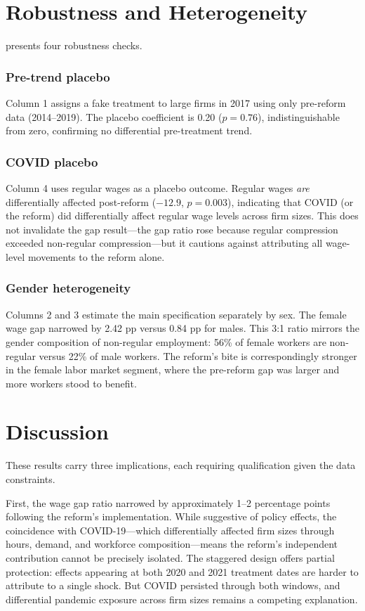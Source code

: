 \documentclass[12pt]{article}
\begin{document}
\section{Robustness and Heterogeneity}

 presents four robustness checks.

\subsubsection*{Pre-trend placebo} Column 1 assigns a fake treatment to large firms in 2017 using only pre-reform data (2014--2019). The placebo coefficient is 0.20 ($p = 0.76$), indistinguishable from zero, confirming no differential pre-treatment trend.

\subsubsection*{COVID placebo} Column 4 uses regular wages as a placebo outcome. Regular wages \textit{are} differentially affected post-reform ($-12.9$, $p = 0.003$), indicating that COVID (or the reform) did differentially affect regular wage levels across firm sizes. This does not invalidate the gap result---the gap ratio rose because regular compression exceeded non-regular compression---but it cautions against attributing all wage-level movements to the reform alone.

\subsubsection*{Gender heterogeneity} Columns 2 and 3 estimate the main specification separately by sex. The female wage gap narrowed by 2.42 pp versus 0.84 pp for males. This 3:1 ratio mirrors the gender composition of non-regular employment: 56\% of female workers are non-regular versus 22\% of male workers. The reform's bite is correspondingly stronger in the female labor market segment, where the pre-reform gap was larger and more workers stood to benefit.



\section{Discussion}

These results carry three implications, each requiring qualification given the data constraints.

First, the wage gap ratio narrowed by approximately 1--2 percentage points following the reform's implementation. While suggestive of policy effects, the coincidence with COVID-19---which differentially affected firm sizes through hours, demand, and workforce composition---means the reform's independent contribution cannot be precisely isolated. The staggered design offers partial protection: effects appearing at both 2020 and 2021 treatment dates are harder to attribute to a single shock. But COVID persisted through both windows, and differential pandemic exposure across firm sizes remains a competing explanation.
\end{document}
